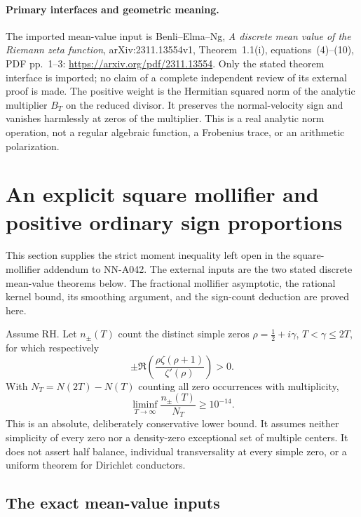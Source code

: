 \paragraph{Primary interfaces and geometric meaning.}
The imported mean-value input is Benli--Elma--Ng,
\emph{A discrete mean value of the Riemann zeta function},
arXiv:2311.13554v1, Theorem~1.1(i), equations~(4)--(10),
PDF pp.~1--3:
\url{https://arxiv.org/pdf/2311.13554}.
Only the stated theorem interface is imported; no claim
of a complete independent review of its external proof is
made.  The positive weight is the Hermitian squared norm
of the analytic multiplier \(B_T\) on the reduced divisor.
It preserves the normal-velocity sign and vanishes
harmlessly at zeros of the multiplier.  This is a real
analytic norm operation, not a regular algebraic function,
a Frobenius trace, or an arithmetic polarization.


\section{An explicit square mollifier and positive ordinary sign proportions}
\label{sec:A047-positive-simple-proportions}

This section supplies the strict moment inequality left open in the
square-mollifier addendum to NN-A042.  The external inputs are the
two stated discrete mean-value theorems below.  The fractional
mollifier asymptotic, the rational kernel bound, its smoothing
argument, and the sign-count deduction are proved here.

\begin{theorem}
\label{thm:A047-positive-proportions}
Assume RH.  Let \(n_\pm(T)\) count the distinct simple zeros
\(\rho=\frac12+i\gamma\), \(T<\gamma\le2T\), for which respectively
\[
       \pm\Re\left(\frac{\rho\zeta(\rho+1)}{\zeta'(\rho)}\right)>0.
\]
With \(N_T=N(2T)-N(T)\) counting all zero occurrences with
multiplicity,
\[
                 \liminf_{T\to\infty}\frac{n_\pm(T)}{N_T}
                                                     \ge10^{-14}.
\]
This is an absolute, deliberately conservative lower bound.
It assumes neither simplicity of every zero nor a density-zero
exceptional set of multiple centers.  It does not assert half
balance, individual transversality at every simple zero, or a
uniform theorem for Dirichlet conductors.
\end{theorem}

\subsection*{The exact mean-value inputs}

